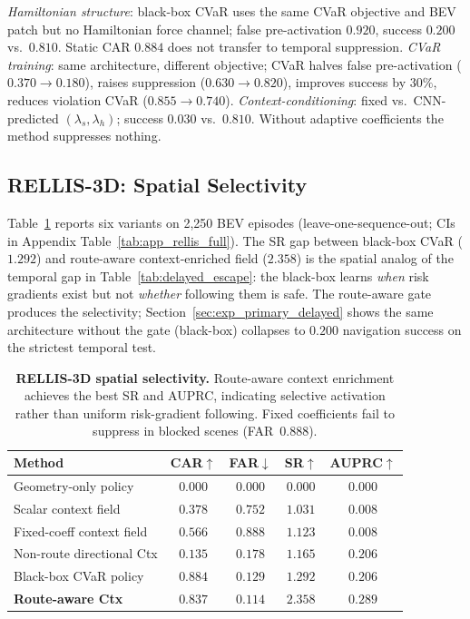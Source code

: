 \emph{Hamiltonian structure}: black-box CVaR uses the same CVaR objective
and BEV patch but no Hamiltonian force channel; false pre-activation
$0.920$, success $0.200$ vs.\ $0.810$. Static CAR $0.884$ does not
transfer to temporal suppression.
\emph{CVaR training}: same architecture, different objective; CVaR halves
false pre-activation ($0.370{\to}0.180$), raises suppression
($0.630{\to}0.820$), improves success by $30\%$, reduces violation CVaR
($0.855{\to}0.740$).
\emph{Context-conditioning}: fixed vs.\ CNN-predicted $(\lambda_s,\lambda_h)$;
success $0.030$ vs.\ $0.810$. Without adaptive coefficients the method
suppresses nothing.

\subsection{RELLIS-3D: Spatial Selectivity}
\label{sec:exp_rellis_static}

Table~\ref{tab:rellis_selectivity} reports six variants on 2{,}250 BEV
episodes (leave-one-sequence-out; CIs in Appendix
Table~\ref{tab:app_rellis_full}). The SR gap between black-box CVaR ($1.292$) and route-aware context-enriched field
($2.358$) is the spatial analog of the temporal gap in
Table~\ref{tab:delayed_escape}: the black-box learns \emph{when} risk
gradients exist but not \emph{whether} following them is safe.
The route-aware gate produces the selectivity; Section~\ref{sec:exp_primary_delayed}
shows the same architecture without the gate (black-box) collapses to
$0.200$ navigation success on the strictest temporal test.

\begin{table}[t]
\centering
\caption{\textbf{RELLIS-3D spatial selectivity.}
Route-aware context enrichment achieves the best SR and AUPRC, indicating
selective activation rather than uniform risk-gradient following. Fixed
coefficients fail to suppress in blocked scenes (FAR~$0.888$).}
\label{tab:rellis_selectivity}
\small
\setlength{\tabcolsep}{5pt}
\renewcommand{\arraystretch}{1.1}
\begin{tabular}{lcccc}
\toprule
Method & CAR$\uparrow$ & FAR$\downarrow$ & SR$\uparrow$ & AUPRC$\uparrow$ \\
\midrule
Geometry-only policy    & $0.000$ & $0.000$ & $0.000$ & $0.000$ \\
Scalar context field            & $0.378$ & $0.752$ & $1.031$ & $0.008$ \\
Fixed-coeff context field    & $0.566$ & $0.888$ & $1.123$ & $0.008$ \\
Non-route directional Ctx  & $0.135$ & $0.178$ & $1.165$ & $0.206$ \\
Black-box CVaR policy     & $0.884$ & $0.129$ & $1.292$ & $0.206$ \\
\textbf{Route-aware Ctx} & $\mathbf{0.837}$ & $\mathbf{0.114}$
                           & $\mathbf{2.358}$ & $\mathbf{0.289}$ \\
\bottomrule
\end{tabular}
\end{table} 

